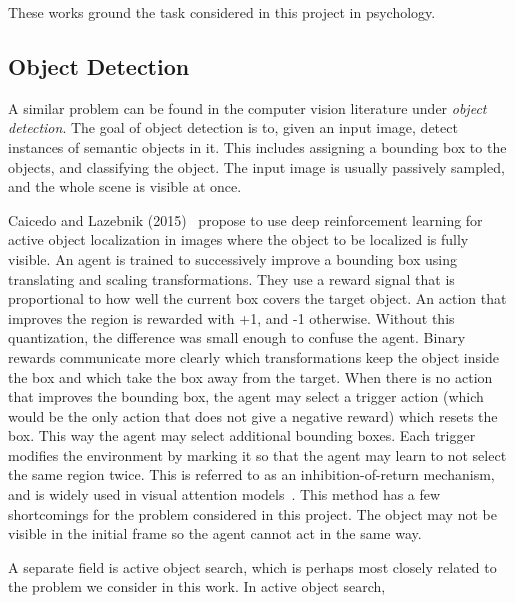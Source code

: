 These works ground the task considered in this project in psychology.


\subsection{Object Detection}


A similar problem can be found in the computer vision literature under \textit{object detection}.
The goal of object detection is to, given an input image, detect instances of semantic objects in it.
This includes assigning a bounding box to the objects, and classifying the object.
The input image is usually passively sampled, and the whole scene is visible at once.

Caicedo and Lazebnik (2015)~\cite{caicedo_active_2015} propose to use deep reinforcement learning for active object localization in images where the object to be localized is fully visible.
An agent is trained to successively improve a bounding box using translating and scaling transformations.
They use a reward signal that is proportional to how well the current box covers the target object.
An action that improves the region is rewarded with +1, and -1 otherwise.
Without this quantization, the difference was small enough to confuse the agent.
Binary rewards communicate more clearly which transformations keep the object inside the box and which take the box away from the target.
When there is no action that improves the bounding box, the agent may select a trigger action (which would be the only action that does not give a negative reward) which resets the box.
This way the agent may select additional bounding boxes.
Each trigger modifies the environment by marking it so that the agent may learn to not select the same region twice.
This is referred to as an inhibition-of-return mechanism, and is widely used in visual attention models~\cite{[16] in caicedo_active_2015}.
This method has a few shortcomings for the problem considered in this project.
The object may not be visible in the initial frame so the agent cannot act in the same way. 

A separate field is active object search, which is perhaps most closely related to the problem we consider in this work.
In active object search, %

